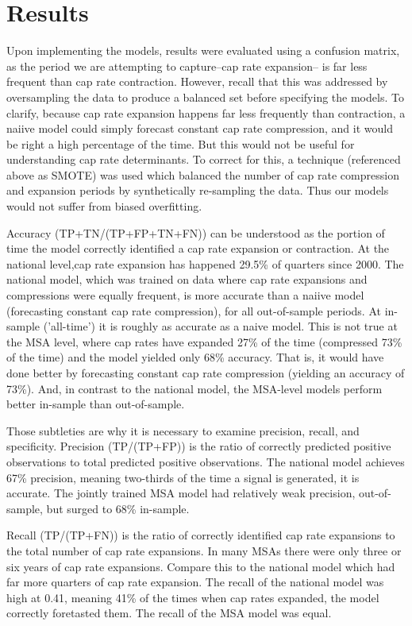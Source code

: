 \section{Results}

Upon implementing the models, results were evaluated using a confusion matrix, as the period we are attempting to capture--cap rate expansion-- is far less frequent than cap rate contraction. However, recall that  this was addressed by oversampling the data to produce a balanced set before specifying the models. To clarify, because cap rate expansion happens far less frequently than contraction, a naiive model could simply forecast constant cap rate compression, and it would be right a high percentage of the time. But this would not be useful for understanding cap rate determinants. To correct for this, a technique (referenced above as SMOTE) was used which balanced the number of cap rate compression and expansion periods by synthetically re-sampling the data. Thus our models would not suffer from biased overfitting.  

Accuracy (TP+TN/(TP+FP+TN+FN)) can be understood as the portion of time the model correctly identified a cap rate expansion or contraction. At the national level,cap rate expansion has happened 29.5\% of quarters since 2000. The national model, which was trained on data where cap rate expansions and compressions were equally frequent, is more accurate than a naiive model (forecasting constant cap rate compression), for all out-of-sample periods. At in-sample ('all-time') it is roughly as accurate as a naive model. This is not true at the MSA level, where cap rates have expanded 27\% of the time (compressed 73\% of the time) and the model yielded only 68\% accuracy. That is, it would have done better by forecasting constant cap rate compression (yielding an accuracy of 73\%). And, in contrast to the national  model, the MSA-level models perform better in-sample than out-of-sample.

Those subtleties are why it is necessary to examine precision, recall, and specificity. Precision (TP/(TP+FP)) is the ratio of correctly predicted positive observations to total predicted positive observations. The national model achieves 67\% precision, meaning two-thirds of the time a signal is generated, it is accurate. The jointly trained MSA model had relatively weak precision, out-of-sample, but surged to 68\% in-sample. 

Recall (TP/(TP+FN)) is the ratio of correctly identified cap rate expansions to the total number of cap rate expansions. In many MSAs there were only three or six years of cap rate expansions. Compare this to the national model which had far more quarters of cap rate expansion. The recall of the national model was high at 0.41, meaning 41\% of the times when cap rates expanded, the model correctly foretasted them. The recall of the MSA model was equal.

